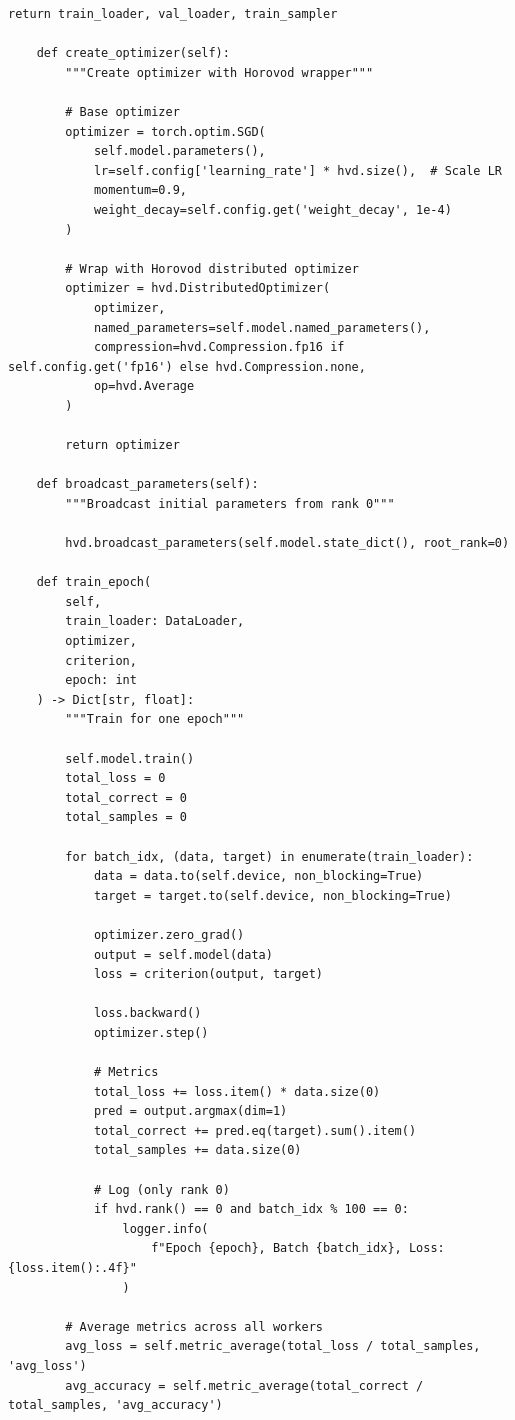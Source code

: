 \begin{lstlisting}[style=python, caption=Distributed Training with Horovod]
        return train_loader, val_loader, train_sampler

    def create_optimizer(self):
        """Create optimizer with Horovod wrapper"""

        # Base optimizer
        optimizer = torch.optim.SGD(
            self.model.parameters(),
            lr=self.config['learning_rate'] * hvd.size(),  # Scale LR
            momentum=0.9,
            weight_decay=self.config.get('weight_decay', 1e-4)
        )

        # Wrap with Horovod distributed optimizer
        optimizer = hvd.DistributedOptimizer(
            optimizer,
            named_parameters=self.model.named_parameters(),
            compression=hvd.Compression.fp16 if self.config.get('fp16') else hvd.Compression.none,
            op=hvd.Average
        )

        return optimizer

    def broadcast_parameters(self):
        """Broadcast initial parameters from rank 0"""

        hvd.broadcast_parameters(self.model.state_dict(), root_rank=0)

    def train_epoch(
        self,
        train_loader: DataLoader,
        optimizer,
        criterion,
        epoch: int
    ) -> Dict[str, float]:
        """Train for one epoch"""

        self.model.train()
        total_loss = 0
        total_correct = 0
        total_samples = 0

        for batch_idx, (data, target) in enumerate(train_loader):
            data = data.to(self.device, non_blocking=True)
            target = target.to(self.device, non_blocking=True)

            optimizer.zero_grad()
            output = self.model(data)
            loss = criterion(output, target)

            loss.backward()
            optimizer.step()

            # Metrics
            total_loss += loss.item() * data.size(0)
            pred = output.argmax(dim=1)
            total_correct += pred.eq(target).sum().item()
            total_samples += data.size(0)

            # Log (only rank 0)
            if hvd.rank() == 0 and batch_idx % 100 == 0:
                logger.info(
                    f"Epoch {epoch}, Batch {batch_idx}, Loss: {loss.item():.4f}"
                )

        # Average metrics across all workers
        avg_loss = self.metric_average(total_loss / total_samples, 'avg_loss')
        avg_accuracy = self.metric_average(total_correct / total_samples, 'avg_accuracy')


\end{lstlisting}
